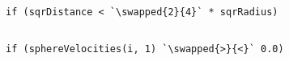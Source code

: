\documentclass[12pt, a4paper]{article}
\newcommand{\removed}[1]{\colorbox{pink}{\vphantom{A}#1}}
\newcommand{\added}[1]{\colorbox{lime}{\vphantom{A}#1}}
\newcommand{\swapped}[2]{\removed{#1}\added{#2}}
\newcommand{\inline}[1]{\fbox{\texttt{#1}}}
\begin{document}
    \subsection{}
        \begin{lstlisting}[caption={The \inline{2} has been replaced with \inline{4}.}, label={lst:f1}]
if (sqrDistance < `\swapped{2}{4}` * sqrRadius)
\end{lstlisting}

    \subsection{}
        \begin{lstlisting}[caption={The \inline{>} has been swapped with \inline{<}.}, label={lst:g1}]
if (sphereVelocities(i, 1) `\swapped{>}{<}` 0.0)
\end{lstlisting}
\end{document}
